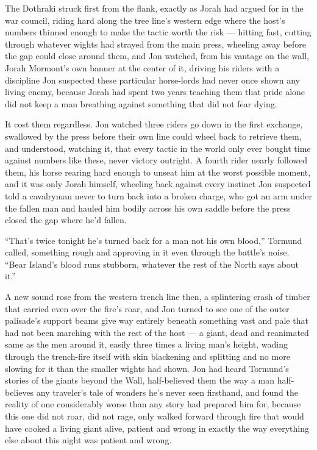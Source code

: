 The Dothraki struck first from the flank, exactly as Jorah had argued for in the war council, riding hard along the tree line’s western edge where the host’s numbers thinned enough to make the tactic worth the risk — hitting fast, cutting through whatever wights had strayed from the main press, wheeling away before the gap could close around them, and Jon watched, from his vantage on the wall, Jorah Mormont’s own banner at the center of it, driving his riders with a discipline Jon suspected these particular horse-lords had never once shown any living enemy, because Jorah had spent two years teaching them that pride alone did not keep a man breathing against something that did not fear dying.

It cost them regardless. Jon watched three riders go down in the first exchange, swallowed by the press before their own line could wheel back to retrieve them, and understood, watching it, that every tactic in the world only ever bought time against numbers like these, never victory outright. A fourth rider nearly followed them, his horse rearing hard enough to unseat him at the worst possible moment, and it was only Jorah himself, wheeling back against every instinct Jon suspected told a cavalryman never to turn back into a broken charge, who got an arm under the fallen man and hauled him bodily across his own saddle before the press closed the gap where he’d fallen.

“That’s twice tonight he’s turned back for a man not his own blood,” Tormund called, something rough and approving in it even through the battle’s noise. “Bear Island’s blood runs stubborn, whatever the rest of the North says about it.”

A new sound rose from the western trench line then, a splintering crash of timber that carried even over the fire’s roar, and Jon turned to see one of the outer palisade’s support beams give way entirely beneath something vast and pale that had not been marching with the rest of the host — a giant, dead and reanimated same as the men around it, easily three times a living man’s height, wading through the trench-fire itself with skin blackening and splitting and no more slowing for it than the smaller wights had shown. Jon had heard Tormund’s stories of the giants beyond the Wall, half-believed them the way a man half-believes any traveler’s tale of wonders he’s never seen firsthand, and found the reality of one considerably worse than any story had prepared him for, because this one did not roar, did not rage, only walked forward through fire that would have cooked a living giant alive, patient and wrong in exactly the way everything else about this night was patient and wrong.

